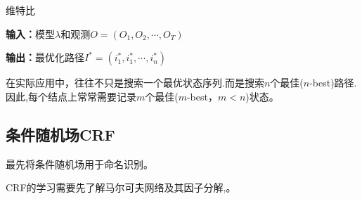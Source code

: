 \documentclass[a4paper,UTF8,no-math]{ctexart}
\begin{document}
	\begin{algorithm}
		\caption{维特比}
		\label{alg:viterbi}
		{\bf 输入：}模型$\lambda$和观测$O = (O_{1},O_{2}, \cdots ,O_{T})$
		
		{\bf 输出：}最优化路径$I^{*} = (i^{*}_{1},i^{*}_{1},\cdots,i^{*}_{n})$
		
		\begin{algorithmic}[1] 
		\end{algorithmic} 
	
	\end{algorithm}
	
	在实际应用中，往往不只是搜索一个最优状态序列.而是搜索$n$个最佳($n$-best)路径.因此,每个结点上常常需要记录$m$个最佳($m$-best，$m<n$)状态。
	
	
	
	\newpage
%	
%	
%	
	

	\subsection{条件随机场CRF}
	
	\citep{lafferty2001conditional}最先将条件随机场用于命名识别。
	
	CRF的学习需要先了解马尔可夫网络及其因子分解\citep{李航2012统计学习方法},\citep{noauthor__nodate}。
	
\end{document}
